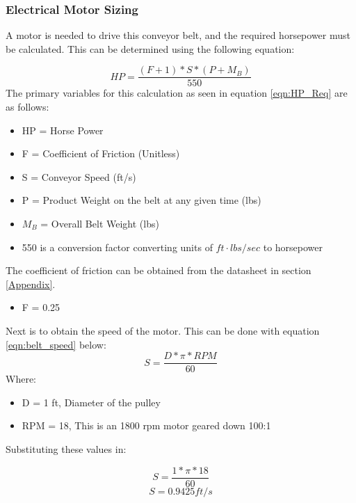 \documentclass[10pt]{project}
\begin{document}
\subsubsection{Electrical Motor Sizing} \label{sec:MotorSizing}
A motor is needed to drive this conveyor belt, and the required horsepower must be calculated. This can be determined using the following equation:

\begin{equation} \label{eqn:HP_Req}
   HP= \frac{(F+1)*S*(P+M_B)}{550} 
\end{equation}
The primary variables for this calculation as seen in equation \ref{eqn:HP_Req} are as follows:
\begin{itemize}[noitemsep, topsep=0pt]
    \item HP = Horse Power 
    \item F = Coefficient of Friction (Unitless)
    \item S = Conveyor Speed (ft/s)
    \item P = Product Weight on the belt at any given time (lbs)
    \item $M_B$ = Overall Belt Weight (lbs)
    \item 550 is a conversion factor converting units of $ft \cdot lbs/sec$ to horsepower
\end{itemize}
\vspace{0.1cm}
The coefficient of friction can be obtained from the datasheet in section \ref{Appendix}. 

\begin{itemize}
    \item F = 0.25
\end{itemize}
Next is to obtain the speed of the motor. This can be done with equation \ref{eqn:belt_speed} below:
\begin{equation}\label{eqn:belt_speed}
    S = \frac{D*\pi*RPM}{60}
\end{equation}
Where:
\begin{itemize}[noitemsep, topsep=0pt]
    \item D = 1 ft, Diameter of the pulley
    \item RPM = 18, This is an 1800 rpm motor geared down 100:1
\end{itemize}
Substituting these values in:
\begin{center}
$$S = \frac{1*\pi*18}{60}$$
$$S = 0.9425 ft/s$$
\end{center} 
\end{document}

